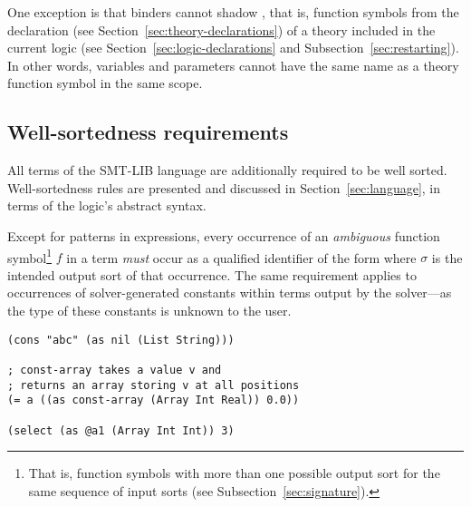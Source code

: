 \begin{remark}
One exception is that binders cannot shadow ,
that is, function symbols from the declaration 
(see Section~\ref{sec:theory-declarations})
of a theory included in the current logic
(see Section~\ref{sec:logic-declarations} and Subsection~\ref{sec:restarting}).
In other words, variables and parameters cannot have the same name 
as a theory function symbol in the same scope.
\end{remark}


\subsection{Well-sortedness requirements} \label{well-sortedness}

All terms of the SMT-LIB language are additionally required to be well sorted.
Well-sortedness rules are presented and discussed in Section~\ref{sec:language},
in terms of the logic's abstract syntax.

Except for patterns in  expressions,
every occurrence of an \emph{ambiguous} function symbol\footnote{%
That is, function symbols with more than one possible output sort 
for the same sequence of input sorts (see Subsection~\ref{sec:signature}).
}
$f$ in a term \emph{must} occur as a qualified identifier of the form
 where $\sigma$ is the intended output sort
of that occurrence.
The same requirement applies to occurrences of solver-generated constants
within terms output by the solver---as the type of these constants is unknown
to the user.

\begin{lstlisting}[linewidth=32em]
(cons "abc" (as nil (List String)))

; const-array takes a value v and
; returns an array storing v at all positions
(= a ((as const-array (Array Int Real)) 0.0))

(select (as @a1 (Array Int Int)) 3)
\end{lstlisting}



